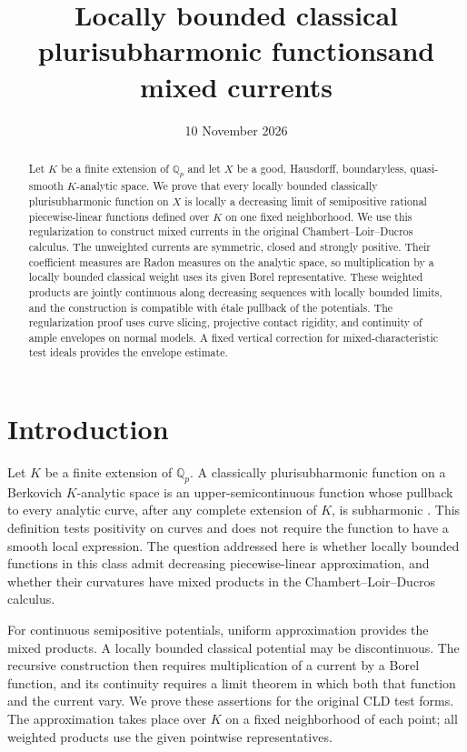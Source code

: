 \documentclass[11pt,reqno]{amsart}
\title[Classical psh functions and mixed currents]{Locally bounded classical plurisubharmonic functions\newline and mixed currents}
\author{}
\date{10 November 2026}
\theoremstyle{definition}
\theoremstyle{remark}
\numberwithin{equation}{section}
\begin{document}
\begin{abstract}
Let $K$ be a finite extension of $\mathbb Q_p$ and let $X$ be a good,
Hausdorff, boundaryless, quasi-smooth $K$-analytic space. We prove that
every locally bounded classically plurisubharmonic function on $X$
is locally a decreasing limit of semipositive rational piecewise-linear
functions defined over $K$ on one fixed neighborhood. We use this
regularization to construct mixed currents in the original
Chambert--Loir--Ducros calculus. The unweighted currents are symmetric,
closed and strongly positive. Their coefficient measures are Radon
measures on the analytic space, so multiplication by a locally bounded
classical weight uses its given Borel representative. These weighted
products are jointly continuous along decreasing sequences with locally
bounded limits, and the construction is compatible with \'etale
pullback of the potentials. The regularization proof uses curve slicing,
projective contact rigidity, and continuity of ample envelopes on
normal models. A fixed vertical correction for mixed-characteristic
test ideals provides the envelope estimate.
\end{abstract}
\maketitle

\section{Introduction}\label{sec:introduction}
Let $K$ be a finite extension of $\mathbb Q_p$. A classically
plurisubharmonic function on a Berkovich $K$-analytic space is an
upper-semicontinuous function whose pullback to every analytic curve,
after any complete extension of $K$, is subharmonic \cite{GR}.
This definition tests positivity on curves and does not require the
function to have a smooth local expression. The question addressed here
is whether locally bounded functions in this class admit decreasing
piecewise-linear approximation, and whether their curvatures have mixed
products in the Chambert--Loir--Ducros calculus.

For continuous semipositive potentials, uniform approximation provides
the mixed products. A locally bounded classical potential may be
discontinuous. The recursive construction then requires multiplication
of a current by a Borel function, and its continuity requires a limit
theorem in which both that function and the current vary. We prove
these assertions for the original CLD test forms. The approximation
takes place over $K$ on a fixed neighborhood of each point; all weighted
products use the given pointwise representatives.
\end{document}
